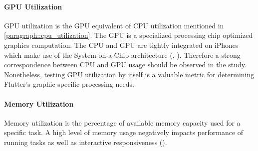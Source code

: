 \paragraph*{GPU Utilization}\label{paragraph::fps}\hfill \break
GPU utilization is the GPU equivalent of CPU utilization mentioned in \ref{paragraph::cpu_utilization}.
The GPU is a specialized processing chip optimized graphics computation.
The CPU and GPU are tightly integrated on iPhones which make use of the System-on-a-Chip architecture (\cite{Martin2001}, \cite{WikiChip2020}).
Therefore a strong correspondence between CPU and GPU usage should be observed in the study. 
Nonetheless, testing GPU utilization by itself is a valuable metric for determining Flutter's graphic specific processing needs.

\paragraph*{Memory Utilization}\label{paragraph::memory_utilization}\hfill \break
Memory utilization is the percentage of available memory capacity used for a specific task. 
A high level of memory usage negatively impacts performance of running tasks as well as interactive responsiveness (\cite{Ljubuncic2015}).

